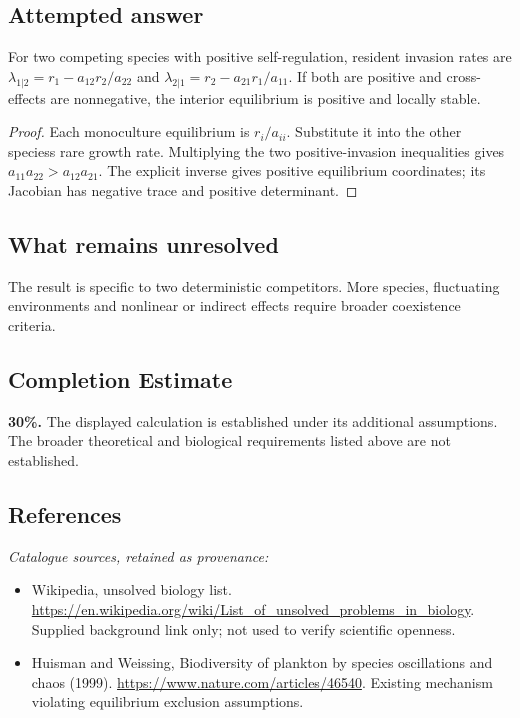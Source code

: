 \documentclass[11pt]{article}
\begin{document}
\subsection{Attempted answer}
\begin{proposition}
For two competing species with positive self-regulation, resident invasion rates are $\lambda_{1|2}=r_1-a_{12}r_2/a_{22}$ and $\lambda_{2|1}=r_2-a_{21}r_1/a_{11}$. If both are positive and cross-effects are nonnegative, the interior equilibrium is positive and locally stable.
\end{proposition}
\begin{proof}
Each monoculture equilibrium is $r_i/a_{ii}$. Substitute it into the other species\textquotesingle s rare growth rate. Multiplying the two positive-invasion inequalities gives $a_{11}a_{22}>a_{12}a_{21}$. The explicit inverse gives positive equilibrium coordinates; its Jacobian has negative trace and positive determinant.
\end{proof}
\subsection{What remains unresolved}
The result is specific to two deterministic competitors. More species, fluctuating environments and nonlinear or indirect effects require broader coexistence criteria.
\subsection{Completion Estimate}
\textbf{30\%.} The displayed calculation is established under its additional assumptions. The broader theoretical and biological requirements listed above are not established.
\subsection{References}
\noindent\emph{Catalogue sources, retained as provenance:}
\begin{itemize}
\item Wikipedia, unsolved biology list. \url{https://en.wikipedia.org/wiki/List_of_unsolved_problems_in_biology}. Supplied background link only; not used to verify scientific openness.
\item Huisman and Weissing, Biodiversity of plankton by species oscillations and chaos (1999). \url{https://www.nature.com/articles/46540}. Existing mechanism violating equilibrium exclusion assumptions.
\end{itemize}
\end{document}

